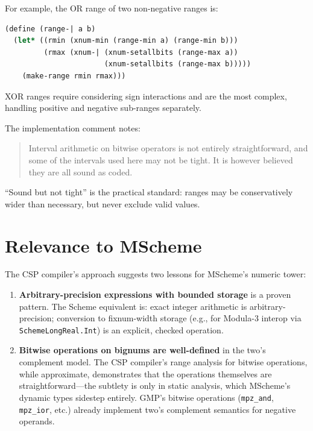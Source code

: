 \documentclass[12pt]{report}
\begin{document}
For example, the OR range of two non-negative ranges is:

\begin{lstlisting}[language=Scheme]
(define (range-| a b)
  (let* ((rmin (xnum-min (range-min a) (range-min b)))
         (rmax (xnum-| (xnum-setallbits (range-max a))
                       (xnum-setallbits (range-max b)))))
    (make-range rmin rmax)))
\end{lstlisting}

\noindent XOR ranges require considering sign interactions and are
the most complex, handling positive and negative sub-ranges
separately.

The implementation comment notes:

\begin{quote}
  Interval arithmetic on bitwise operators is not entirely
  straightforward, and some of the intervals used here may not be
  tight.  It is however believed they are all sound as coded.
\end{quote}

\noindent ``Sound but not tight'' is the practical standard: ranges
may be conservatively wider than necessary, but never exclude valid
values.

\section{Relevance to MScheme}

The CSP compiler's approach suggests two lessons for MScheme's
numeric tower:

\begin{enumerate}
\item \textbf{Arbitrary-precision expressions with bounded storage}
  is a proven pattern.  The Scheme equivalent is: exact integer
  arithmetic is arbitrary-precision; conversion to fixnum-width
  storage (e.g., for Modula-3 interop via {\tt SchemeLongReal.Int})
  is an explicit, checked operation.

\item \textbf{Bitwise operations on bignums are well-defined} in the
  two's complement model.  The CSP compiler's range analysis for
  bitwise operations, while approximate, demonstrates that the
  operations themselves are straightforward---the subtlety is only in
  static analysis, which MScheme's dynamic types sidestep entirely.
  GMP's bitwise operations ({\tt mpz\_and}, {\tt mpz\_ior}, etc.)
  already implement two's complement semantics for negative operands.
\end{enumerate}
\end{document}
